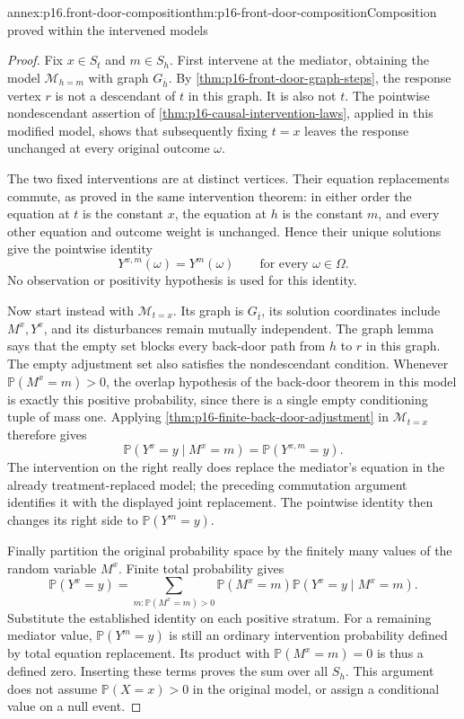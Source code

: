 \begin{annexitem}{annex:p16.front-door-composition}{thm:p16-front-door-composition}{Composition proved within the intervened models}
\begin{proof}
Fix \(x\in S_t\) and \(m\in S_h\). First intervene at the
mediator, obtaining the model \(\mathcal M_{h=m}\) with graph
\(G_{\overline h}\). By
\cref{thm:p16-front-door-graph-steps}, the response vertex \(r\)
is not a descendant of \(t\) in this graph. It is also not \(t\).
The pointwise nondescendant assertion of
\cref{thm:p16-causal-intervention-laws}, applied in this modified
model, shows that subsequently fixing \(t=x\) leaves the response
unchanged at every original outcome \(\omega\).

The two fixed interventions are at distinct vertices. Their equation
replacements commute, as proved in the same intervention theorem: in
either order the equation at \(t\) is the constant \(x\), the
equation at \(h\) is the constant \(m\), and every other equation
and outcome weight is unchanged. Hence their unique solutions give
the pointwise identity
\[
 Y^{x,m}(\omega)=Y^m(\omega)
       \qquad\text{for every }\omega\in\Omega.
\]
No observation or positivity hypothesis is used for this identity.

Now start instead with \(\mathcal M_{t=x}\). Its graph is
\(G_{\overline t}\), its solution coordinates include \(M^x,Y^x\),
and its disturbances remain mutually independent. The graph lemma
says that the empty set blocks every back-door path from \(h\)
to \(r\) in this graph. The empty adjustment set also satisfies
the nondescendant condition. Whenever \(\mathbb P(M^x=m)>0\),
the overlap hypothesis of the back-door theorem in this model is
exactly this positive probability, since there is a single empty
conditioning tuple of mass one. Applying
\cref{thm:p16-finite-back-door-adjustment} in \(\mathcal M_{t=x}\)
therefore gives
\[
 \mathbb P(Y^x=y\mid M^x=m)=\mathbb P(Y^{x,m}=y).
\]
The intervention on the right really does replace the mediator's
equation in the already treatment-replaced model; the preceding
commutation argument identifies it with the displayed joint replacement.
The pointwise identity then changes its right side to
\(\mathbb P(Y^m=y)\).

Finally partition the original probability space by the finitely many
values of the random variable \(M^x\). Finite total probability
gives
\[
 \mathbb P(Y^x=y)
 =\sum_{m:\mathbb P(M^x=m)>0}
       \mathbb P(M^x=m)\mathbb P(Y^x=y\mid M^x=m).
\]
Substitute the established identity on each positive stratum. For a
remaining mediator value, \(\mathbb P(Y^m=y)\) is still an ordinary
intervention probability defined by total equation replacement. Its
product with \(\mathbb P(M^x=m)=0\) is thus a defined zero.
Inserting these terms proves the sum over all \(S_h\). This
argument does not assume \(\mathbb P(X=x)>0\) in the original
model, or assign a conditional value on a null event.
\end{proof}
\end{annexitem}


